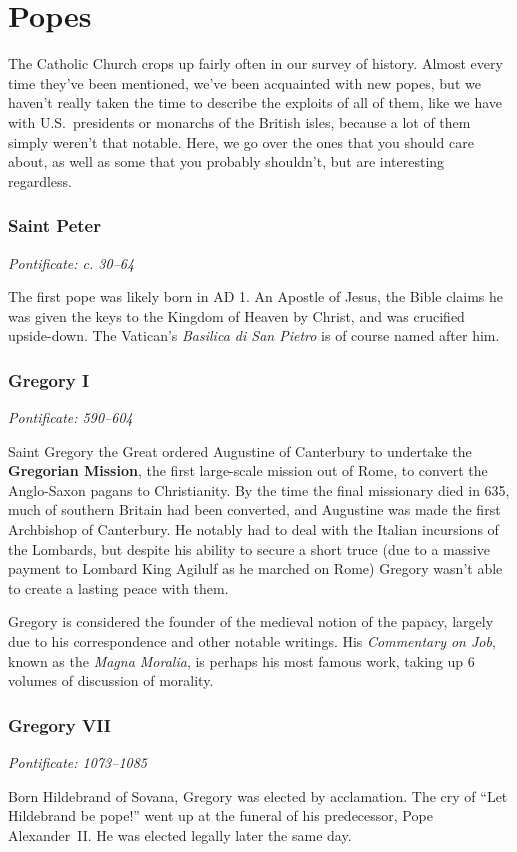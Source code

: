 \chapter{Popes}

\newcommand{\papacy}[2]{\noindent\textit{Pontificate: #1--#2}}

\newcommand{\pope}[3]{%
  \subsection*{#1}
  \papacy{#2}{#3}
}

The Catholic Church crops up fairly often in our survey of history.
Almost every time they've been mentioned, we've been acquainted with new popes,
but we haven't really taken the time to describe the exploits of all of them,
like we have with U.S.\ presidents or monarchs of the British isles,
because a lot of them simply weren't that notable.
Here, we go over the ones that you should care about,
as well as some that you probably shouldn't, but are interesting regardless.

\pope{Saint Peter}{c. 30}{64}

The first pope was likely born in AD 1.
An Apostle of Jesus, the Bible claims he was given the keys to the Kingdom of Heaven by Christ,
and was crucified upside-down.
The Vatican's \textit{Basilica di San Pietro} is of course named after him.

\pope{Gregory I}{590}{604}

Saint Gregory the Great ordered Augustine of Canterbury to undertake the \textbf{Gregorian Mission},
the first large-scale mission out of Rome,
to convert the Anglo-Saxon pagans to Christianity.
By the time the final missionary died in 635, much of southern Britain had been converted,
and Augustine was made the first Archbishop of Canterbury.
He notably had to deal with the Italian incursions of the Lombards,
but despite his ability to secure a short truce
(due to a massive payment to Lombard King Agilulf as he marched on Rome)
Gregory wasn't able to create a lasting peace with them.

Gregory is considered the founder of the medieval notion of the papacy,
largely due to his correspondence and other notable writings.
His \textit{Commentary on Job}, known as the \textit{Magna Moralia},
is perhaps his most famous work, taking up 6 volumes of discussion of morality.

\pope{Gregory VII}{1073}{1085}

Born Hildebrand of Sovana, Gregory was elected by acclamation.
The cry of ``Let Hildebrand be pope!'' went up at the funeral of his predecessor,
Pope Alexander~II\@.
He was elected legally later the same day.

